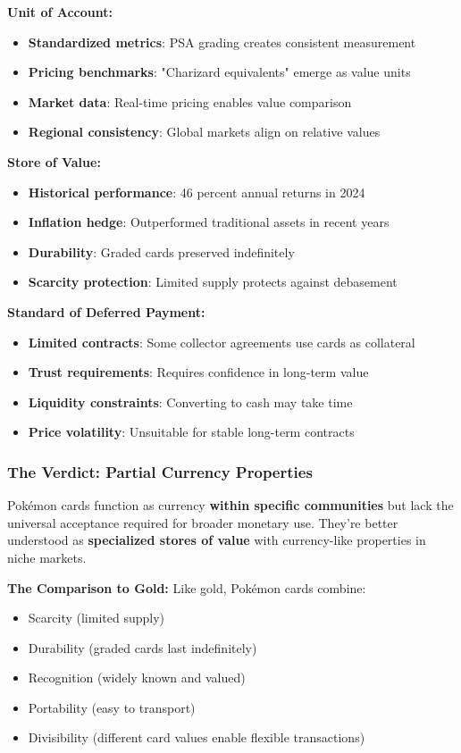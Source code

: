 \documentclass[11pt,oneside]{book}
\begin{document}
{{{{{{\textbf{Unit of Account:}
\begin{itemize}
\item \textbf{Standardized metrics}: PSA grading creates consistent measurement
\item \textbf{Pricing benchmarks}: "Charizard equivalents" emerge as value units
\item \textbf{Market data}: Real-time pricing enables value comparison
\item \textbf{Regional consistency}: Global markets align on relative values
\end{itemize}

\textbf{Store of Value:}
\begin{itemize}
\item \textbf{Historical performance}: 46 percent annual returns in 2024
\item \textbf{Inflation hedge}: Outperformed traditional assets in recent years
\item \textbf{Durability}: Graded cards preserved indefinitely
\item \textbf{Scarcity protection}: Limited supply protects against debasement
\end{itemize}

\textbf{Standard of Deferred Payment:}
\begin{itemize}
\item \textbf{Limited contracts}: Some collector agreements use cards as collateral
\item \textbf{Trust requirements}: Requires confidence in long-term value
\item \textbf{Liquidity constraints}: Converting to cash may take time
\item \textbf{Price volatility}: Unsuitable for stable long-term contracts
\end{itemize}

\subsubsection{The Verdict: Partial Currency Properties}

Pokémon cards function as currency \textbf{within specific communities} but lack the universal acceptance required for broader monetary use. They're better understood as \textbf{specialized stores of value} with currency-like properties in niche markets.

\textbf{The Comparison to Gold:}
Like gold, Pokémon cards combine:
\begin{itemize}
\item Scarcity (limited supply)
\item Durability (graded cards last indefinitely)
\item Recognition (widely known and valued)
\item Portability (easy to transport)
\item Divisibility (different card values enable flexible transactions)
\end{itemize}

}}}}}}
\end{document}
